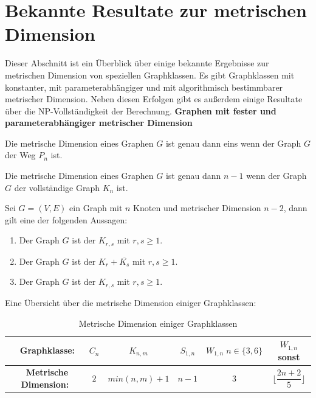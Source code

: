 \newpage
\section{Bekannte Resultate zur metrischen Dimension}
\vspace{-2mm}
Dieser Abschnitt ist ein Überblick über einige bekannte Ergebnisse zur metrischen Dimension von speziellen Graphklassen. Es gibt Graphklassen mit konstanter, mit parameterabhängiger und mit algorithmisch bestimmbarer metrischer Dimension.\newline
Neben diesen Erfolgen gibt es außerdem einige Resultate über die NP-Vollständigkeit der Berechnung.\newline\newline
{\textbf{Graphen mit fester und parameterabhängiger metrischer Dimension}}
\begin{lem}
\label{path}\cite{landmarks}
Die metrische Dimension eines Graphen $G$ ist genau dann eins wenn der Graph $G$ der Weg $P_n$ ist.
\end{lem}
\begin{lem}
\label{complete}\cite{landmarks}
Die metrische Dimension eines Graphen $G$ ist genau dann $n-1$ wenn der Graph $G$ der vollständige Graph $K_n$ ist.
\end{lem}
\begin{lem}\cite{landmarks}
Sei $G = (V, E)$ ein Graph mit $n$ Knoten und metrischer Dimension $n-2$, dann gilt eine der folgenden Aussagen:
\begin{enumerate}
\item Der Graph $G$ ist der $K_{r,s}$ mit $r,s \geq 1$.
\item Der Graph $G$ ist der $K_{r}+ \overline{K_s}$ mit $r,s \geq 1$.
\item Der Graph $G$ ist der $K_{r,s}$ mit $r,s \geq 1$.
\end{enumerate}
\end{lem}
Eine Übersicht über die metrische Dimension einiger Graphklassen:
  \begin{table}[htb]
     \centering
     \begin{tabularx}{\textwidth}{|c|c|c|c|c|c|}
     	\hline  
       \parbox[c][4em][c]{0pt}{~}\textbf{Graphklasse:} & $C_n$&$K_{n,m}$&$S_{1,n}$&$W_{1,n}\;n \in \{3,6\}$&$W_{1,n}$ sonst \\[1em]
		\hline       
       \parbox[c][4em][c]{0pt}{~}\textbf{Metrische Dimension:}& $2$&$min(n,m)+1$& $n-1$  &$3$  &$\lfloor \dfrac{2n+2}{5} \rfloor$        \\[1em]
       	\hline  
     \end{tabularx}
 
     \caption{Metrische Dimension einiger Graphklassen}
     \label{tbl:Metrische Dimension einiger Graphklassen}
   \end{table}
